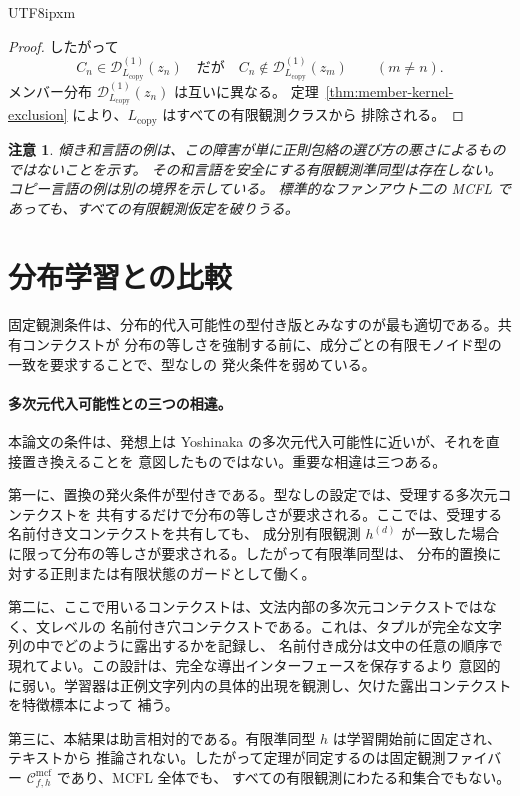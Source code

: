 \documentclass[10pt,a4paper]{article}
\newtheorem{remark}[theorem]{注意}
\theoremstyle{remark}
\newcommand{\Cmcf}[2]{\mathcal{C}^{\mathrm{mcf}}_{#1,#2}}
\newcommand{\D}{\mathcal{D}}
\begin{document}
\begin{CJK}{UTF8}{ipxm}
\begin{proof}
したがって
\[
  C_n\in\D_{L_{\mathrm{copy}}}^{(1)}(z_n)
  \quad\text{だが}\quad
  C_n\notin\D_{L_{\mathrm{copy}}}^{(1)}(z_m)
  \qquad(m\ne n).
\]
メンバー分布 \(\D_{L_{\mathrm{copy}}}^{(1)}(z_n)\) は互いに異なる。
定理~\ref{thm:member-kernel-exclusion} により、\(L_{\mathrm{copy}}\) はすべての有限観測クラスから
排除される。
\end{proof}

\begin{remark}
傾き和言語の例は、この障害が単に正則包絡の選び方の悪さによるものではないことを示す。
その和言語を安全にする有限観測準同型は存在しない。コピー言語の例は別の境界を示している。
標準的なファンアウト二の MCFL であっても、すべての有限観測仮定を破りうる。
\end{remark}


\section{分布学習との比較}
\label{sec:comparison}

固定観測条件は、分布的代入可能性の型付き版とみなすのが最も適切である。共有コンテクストが
分布の等しさを強制する前に、成分ごとの有限モノイド型の一致を要求することで、型なしの
発火条件を弱めている。

\paragraph{多次元代入可能性との三つの相違。}
本論文の条件は、発想上は Yoshinaka の多次元代入可能性に近いが、それを直接置き換えることを
意図したものではない。重要な相違は三つある。

第一に、置換の発火条件が型付きである。型なしの設定では、受理する多次元コンテクストを
共有するだけで分布の等しさが要求される。ここでは、受理する名前付き文コンテクストを共有しても、
成分別有限観測 \(h^{(d)}\) が一致した場合に限って分布の等しさが要求される。したがって有限準同型は、
分布的置換に対する正則または有限状態のガードとして働く。

第二に、ここで用いるコンテクストは、文法内部の多次元コンテクストではなく、文レベルの
名前付き穴コンテクストである。これは、タプルが完全な文字列の中でどのように露出するかを記録し、
名前付き成分は文中の任意の順序で現れてよい。この設計は、完全な導出インターフェースを保存するより
意図的に弱い。学習器は正例文字列内の具体的出現を観測し、欠けた露出コンテクストを特徴標本によって
補う。

第三に、本結果は助言相対的である。有限準同型 \(h\) は学習開始前に固定され、テキストから
推論されない。したがって定理が同定するのは固定観測ファイバー \(\Cmcf{f}{h}\) であり、MCFL 全体でも、
すべての有限観測にわたる和集合でもない。


\end{CJK}
\end{document}
